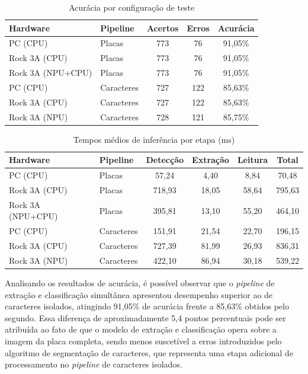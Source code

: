 \begin{table}[H] 
\centering \caption{Acurácia por configuração de teste} 
\label{tab:acuracia} 
\begin{tabular}{llccc} \hline 
\textbf{Hardware} & \textbf{Pipeline} & \textbf{Acertos} & \textbf{Erros} & \textbf{Acurácia} \\ \hline 
PC (CPU)           & Placas     & 773 &  76 & 91,05\% \\ 
Rock 3A (CPU)      & Placas     & 773 &  76 & 91,05\% \\ 
Rock 3A (NPU+CPU)  & Placas     & 773 &  76 & 91,05\% \\ \hline
PC (CPU)           & Caracteres          & 727 & 122 & 85,63\% \\ 
Rock 3A (CPU)      & Caracteres          & 727 & 122 & 85,63\% \\ 
Rock 3A (NPU)      & Caracteres & 728 & 121 & 85,75\% \\ \hline 
\end{tabular} 
\end{table}

\begin{table}[H] 
\centering \caption{Tempos médios de inferência por etapa (ms)} 
\label{tab:tempos} 
\begin{tabular}{llcccc} \hline 
\textbf{Hardware} & \textbf{Pipeline} & \textbf{Detecção} & \textbf{Extração} & \textbf{Leitura} & \textbf{Total} \\ \hline  
PC (CPU)           & Placas     &  57,24 &   4,40 &   8,84 &  70,48 \\ 
Rock 3A (CPU)      & Placas     & 718,93 &  18,05 &  58,64 & 795,63 \\ 
Rock 3A (NPU+CPU)  & Placas     & 395,81 &  13,10 &  55,20 & 464,10 \\ \hline
PC (CPU)           & Caracteres          & 151,91 &  21,54 &  22,70 & 196,15 \\
Rock 3A (CPU)      & Caracteres          & 727,39 &  81,99 &  26,93 & 836,31 \\ 
Rock 3A (NPU)      & Caracteres & 422,10 &  86,94 &  30,18 & 539,22 \\ \hline 
\end{tabular} 
\end{table}

Analisando os resultados de acurácia, é possível observar que o \textit{pipeline} de extração e classificação simultânea apresentou desempenho superior ao de caracteres isolados, atingindo 91,05\% de acurácia frente a 85,63\% obtidos pelo segundo. Essa diferença de aproximadamente 5,4 pontos percentuais pode ser atribuída ao fato de que o modelo de extração e classificação opera sobre a imagem da placa completa, sendo menos suscetível a erros introduzidos pelo algoritmo de segmentação de caracteres, que representa uma etapa adicional de processamento no \textit{pipeline} de caracteres isolados.

